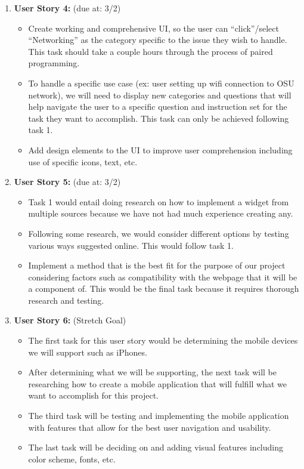 \documentclass[12pt, letterpaper]{article}
\begin{document}
\begin{enumerate}
\begin{itemize}
	\end{itemize}
	\item \textbf{User Story 4:} (due at: 3/2) 
	\begin{itemize}
		\item Create working and comprehensive UI, so the user can “click”/select “Networking” as the category specific to the issue they wish to handle. This task should take a couple hours through the process of paired programming.
		\item To handle a specific use case (ex: user setting up wifi connection to OSU network), we will need to display new categories and questions that will help navigate the user to a specific question and instruction set for the task they want to accomplish.  This task can only be achieved following task 1.
		\item Add design elements to the UI to improve user comprehension including use of specific icons, text, etc.
	\end{itemize}
	\item \textbf{User Story 5:} (due at: 3/2) 
	\begin{itemize}
		\item Task 1 would entail doing research on how to implement a widget from multiple sources because we have not had much experience creating any.
		\item Following some research, we would consider different options by testing various ways suggested online.  This would follow task 1.
		\item Implement a method that is the best fit for the purpose of our project considering factors such as compatibility with the webpage that it will be a component of.  This would be the final task because it requires thorough research and testing.
	\end{itemize} 
	\item \textbf{User Story 6:} (Stretch Goal) 
	\begin{itemize}
		\item The first task for this user story would be determining the mobile devices we will support such as iPhones. 
		\item After determining what we will be supporting, the next task will be researching how to create a mobile application that will fulfill what we want to accomplish for this project.
		\item The third task will be testing and implementing the mobile application with features that allow for the best user navigation and usability.  
		\item The last task will be deciding on and adding visual features including color scheme, fonts, etc.

\end{itemize}
\end{enumerate}
\end{document}
